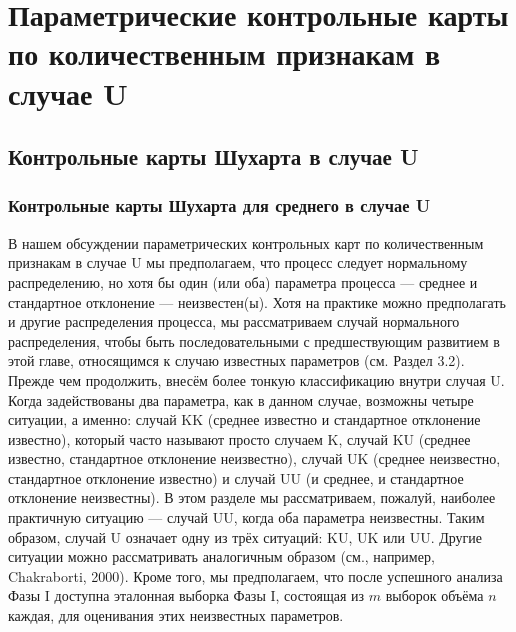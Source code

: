 \section{Параметрические контрольные карты по количественным признакам в случае U}

\subsection{Контрольные карты Шухарта в случае U}

\subsubsection{Контрольные карты Шухарта для среднего в случае U}

В нашем обсуждении параметрических контрольных карт по количественным признакам в случае U мы предполагаем, что процесс следует нормальному распределению, но хотя бы один (или оба) параметра процесса — среднее и стандартное отклонение — неизвестен(ы). Хотя на практике можно предполагать и другие распределения процесса, мы рассматриваем случай нормального распределения, чтобы быть последовательными с предшествующим развитием в этой главе, относящимся к случаю известных параметров (см. Раздел 3.2). Прежде чем продолжить, внесём более тонкую классификацию внутри случая U. Когда задействованы два параметра, как в данном случае, возможны четыре ситуации, а именно: случай KK (среднее известно и стандартное отклонение известно), который часто называют просто случаем K, случай KU (среднее известно, стандартное отклонение неизвестно), случай UK (среднее неизвестно, стандартное отклонение известно) и случай UU (и среднее, и стандартное отклонение неизвестны). В этом разделе мы рассматриваем, пожалуй, наиболее практичную ситуацию — случай UU, когда оба параметра неизвестны. Таким образом, случай U означает одну из трёх ситуаций: KU, UK или UU. Другие ситуации можно рассматривать аналогичным образом (см., например, Chakraborti, 2000). Кроме того, мы предполагаем, что после успешного анализа Фазы I доступна эталонная выборка Фазы I, состоящая из \(m\) выборок объёма \(n\) каждая, для оценивания этих неизвестных параметров.

